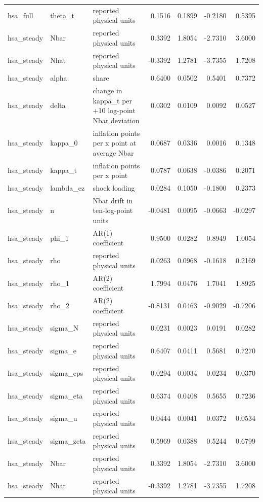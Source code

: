\begin{tabular}{lllrrrr}
hsa\_full & theta\_t & reported physical units & 0.1516 & 0.1899 & -0.2180 & 0.5395 \\
hsa\_steady & Nbar & reported physical units & 0.3392 & 1.8054 & -2.7310 & 3.6000 \\
hsa\_steady & Nhat & reported physical units & -0.3392 & 1.2781 & -3.7355 & 1.7208 \\
hsa\_steady & alpha & share & 0.6400 & 0.0502 & 0.5401 & 0.7372 \\
hsa\_steady & delta & change in kappa\_t per +10 log-point Nbar deviation & 0.0302 & 0.0109 & 0.0092 & 0.0527 \\
hsa\_steady & kappa\_0 & inflation points per x point at average Nbar & 0.0687 & 0.0336 & 0.0016 & 0.1348 \\
hsa\_steady & kappa\_t & inflation points per x point & 0.0787 & 0.0638 & -0.0386 & 0.2071 \\
hsa\_steady & lambda\_ez & shock loading & 0.0284 & 0.1050 & -0.1800 & 0.2373 \\
hsa\_steady & n & Nbar drift in ten-log-point units & -0.0481 & 0.0095 & -0.0663 & -0.0297 \\
hsa\_steady & phi\_1 & AR(1) coefficient & 0.9500 & 0.0282 & 0.8949 & 1.0054 \\
hsa\_steady & rho & reported physical units & 0.0263 & 0.0968 & -0.1618 & 0.2169 \\
hsa\_steady & rho\_1 & AR(2) coefficient & 1.7994 & 0.0476 & 1.7041 & 1.8925 \\
hsa\_steady & rho\_2 & AR(2) coefficient & -0.8131 & 0.0463 & -0.9029 & -0.7206 \\
hsa\_steady & sigma\_N & reported physical units & 0.0231 & 0.0023 & 0.0191 & 0.0282 \\
hsa\_steady & sigma\_e & reported physical units & 0.6407 & 0.0411 & 0.5681 & 0.7270 \\
hsa\_steady & sigma\_eps & reported physical units & 0.0294 & 0.0034 & 0.0234 & 0.0370 \\
hsa\_steady & sigma\_eta & reported physical units & 0.6374 & 0.0408 & 0.5655 & 0.7236 \\
hsa\_steady & sigma\_u & reported physical units & 0.0444 & 0.0041 & 0.0372 & 0.0534 \\
hsa\_steady & sigma\_zeta & reported physical units & 0.5969 & 0.0388 & 0.5244 & 0.6799 \\
hsa\_steady & Nbar & reported physical units & 0.3392 & 1.8054 & -2.7310 & 3.6000 \\
hsa\_steady & Nhat & reported physical units & -0.3392 & 1.2781 & -3.7355 & 1.7208 \\

\end{tabular}
